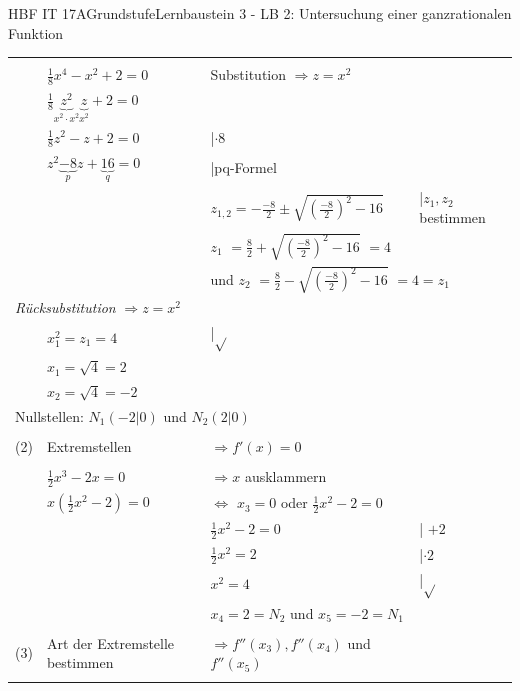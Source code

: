 \documentclass[oneside,openany,headings=optiontotoc,11pt,numbers=noenddot]{scrreprt}
\begin{document}
\begin{worksheet}{HBF IT 17A}{Grundstufe}{Lernbaustein 3 - LB 2: Untersuchung einer ganzrationalen Funktion}
\begin{framed}
\begin{tabularx}{\textwidth}{lXXl}
				\hline\\
				& \(\frac{1}{8}x^4 -x^2+2 = 0\) & Substitution \(\Rightarrow z = x^2\)\\
				& \(\frac{1}{8}\underbrace{z^2}_{x^2\cdot x^2} \underbrace{z}_{x^2} +2 = 0\)\\
				& \(\frac{1}{8}z^2  -z +2 = 0\) & |\(\cdot 8\)\\
				& \(z^2  \underbrace{-8}_{p}z +\underbrace{16}_{q} = 0\) & |pq-Formel\\
				& & \(z_{1,2} = -\frac{-8}{2} \pm \sqrt{\left(\frac{-8}{2}\right)^2 -16}\) & |\(z_1,z_2\) bestimmen\\
				& & \multicolumn{2}{l}{\colorbox{green!10}{\(z_1\)} \(= \frac{8}{2} + \sqrt{\left(\frac{-8}{2}\right)^2 -16}\) \colorbox{green!10}{\(= 4\)}}\\
				& & \multicolumn{2}{l}{und \colorbox{green!10}{\(z_2\)} \(= \frac{8}{2} - \sqrt{\left(\frac{-8}{2}\right)^2 -16}\) \colorbox{green!10}{\(=4 = z_1\)}}\\
				\multicolumn{4}{l}{\textit{Rücksubstitution} \(\Rightarrow z = x^2\)}\\
				& \(x^2_1 = z_1 = 4\) & |\(\sqrt{}\)\\
				& \colorbox{blue!5}{\(x_{1} = \sqrt{4} = 2\)}\\
				& \colorbox{blue!5}{\(x_{2} = \sqrt{4} = -2\)}\\
				\multicolumn{4}{l}{Nullstellen: \colorbox{blue!5}{\(N_1(-2|0)\)} und \colorbox{blue!5}{\(N_2(2|0)\)}}\\
				\hline\hline\\
				(2) & Extremstellen & \(\Rightarrow f'(x) = 0\)\\
				\hline\\
				& \(\frac{1}{2}x^3-2x = 0\) & \(\Rightarrow x\) ausklammern\\
				& \(x(\frac{1}{2}x^2-2) = 0\) & \(\Leftrightarrow \) \colorbox{blue!5}{\(x_3 = 0\)} oder \(\frac{1}{2}x^2-2 = 0\)\\
				& & \(\frac{1}{2}x^2-2 = 0\) & | \(+2\)\\
				& & \(\frac{1}{2}x^2 = 2\) & |\(\cdot 2\)\\
				& & \(x^2 = 4\) & |\(\sqrt{}\)\\
				& & \colorbox{blue!5}{\(x_4 = 2 = N_2\)} und \colorbox{blue!5}{\(x_5 = -2 = N_1\)}\\
				\\
				(3) & Art der Extremstelle bestimmen & \(\Rightarrow f''(x_3), f''(x_4)\) und \(f''(x_5)\)\\
				\hline\\		

\end{tabularx}
\end{framed}
\end{worksheet}
\end{document}
